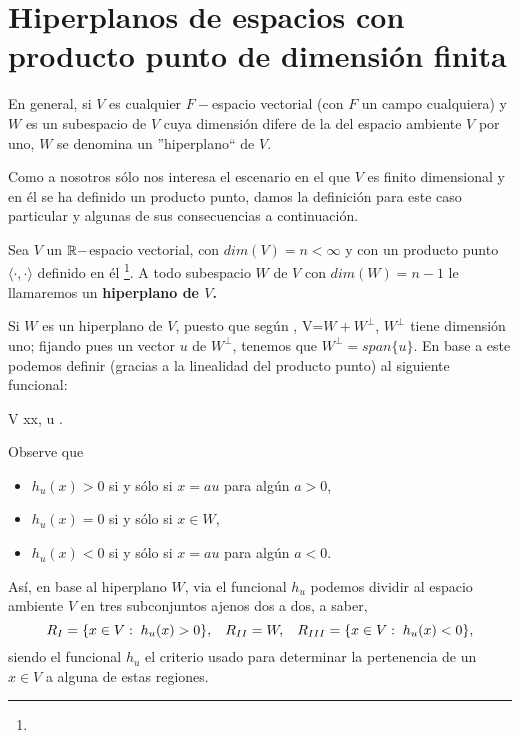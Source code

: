 \section{Hiperplanos de espacios con producto punto de dimensión finita}
\label{section: hiperplanos}
En general, si $V$ es cualquier $F-$espacio vectorial (con $F$
un campo cualquiera) y $W$ es un subespacio de $V$
cuya dimensión difere de la del espacio ambiente $V$
por uno, $W$ se denomina un ''hiperplano`` de $V$.

Como a nosotros sólo nos interesa el escenario
en el que $V$ es finito dimensional y 
en él se ha definido un producto punto, damos la
definición para este caso
particular y algunas de sus consecuencias a continuación.

\begin{defi}
Sea $V$ un $\mathbb{R}-$espacio vectorial,
con $dim(V)=n < \infty$ y con un producto punto $\langle \cdot, \cdot \rangle$
definido en él \footnote{}. A todo subespacio
$W$ de $V$ con $dim(W)=n-1$ le llamaremos un
\textbf{hiperplano de $V$.}
\end{defi}



Si $W$ es un hiperplano de $V$, puesto que
según , V=$W + W^{\perp}$,
$W^{\perp}$ tiene dimensión uno; fijando pues un
vector $u$ de $W^{\perp}$, tenemos que
$W^{\perp}=span\{ u\}$. En base a este 
podemos definir (gracias a la linealidad
del producto punto) al siguiente funcional:

\begin{center}
{V}
{\IR }
{x}{\langle x, u \rangle.}
\end{center}
Observe que
\begin{itemize}
\item $h_{u}(x)>0$ si y sólo si $x= a u$ para algún $a>0$,
\item $h_{u}(x)=0$ si y sólo si $x \in W$,
\item $h_{u}(x)<0$ si y sólo si $x= a u$ para algún $a<0$.
\end{itemize}
Así, en base al hiperplano $W$, via
el funcional $h_{u}$ podemos dividir
al espacio ambiente $V$ en tres subconjuntos ajenos
dos a dos, a saber, 
\begin{equation}
\label{eq1: 29Nov}
R_{I}= \{ x \in V: \hspace{0.1cm} h_{u}(x)> 0 \},
\hspace{0.3cm}
R_{II}=W, 
\hspace{0.3cm}
R_{III}= \{ x \in V: \hspace{0.1cm} h_{u}(x)<0 \},
\end{equation}
siendo el funcional $h_{u}$ el criterio usado para
determinar la pertenencia de un $x \in V$ a alguna de estas regiones.

